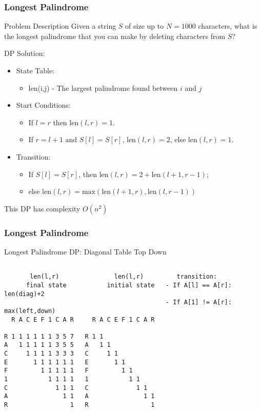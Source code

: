 \begin{frame}
  \frametitle{Longest Palindrome}
    \begin{block}{Problem Description}
      Given a string $S$ of size up to $N = 1000$ characters, what is the
      longest palindrome that you can make by deleting characters from $S$?
    \end{block}

    DP Solution:
    \begin{itemize}
    \item State Table:
      {\smaller
      \begin{itemize}
      \item len(i,j) - The largest palindrome found between $i$ and $j$
      \end{itemize}}
    \item Start Conditions:
      {\smaller
      \begin{itemize}
        \item If $l=r$ then len$(l,r)=1$.
        \item If $r=l+1 \text{ and } S[l]=S[r]$, len$(l,r)=2$, else len$(l,r)=1$.
      \end{itemize}}
    \item Transition:
      {\smaller
      \begin{itemize}
        \item If $S[l]=S[r]$, then len$(l,r)=2+\text{len}(l+1,r-1)$;
        \item else $\text{len}(l,r) = \text{max}(\text{len}(l+1,r),\text{len}(l,r-1))$
      \end{itemize}}
    \end{itemize}

    This DP has complexity $O(n^2)$
\end{frame}

\begin{frame}[fragile]
  \frametitle{Longest Palindrome}

  Longest Palindrome DP: Diagonal Table Top Down

  {\smaller
\begin{verbatim}

       len(l,r)               len(l,r)         transition:
      final state           initial state   - If A[l] == A[r]: len(diag)+2
                                            - If A[1] != A[r]: max(left,down)
  R A C E F 1 C A R     R A C E F 1 C A R

R 1 1 1 1 1 1 3 5 7   R 1 1
A   1 1 1 1 1 3 5 5   A   1 1
C     1 1 1 1 3 3 3   C     1 1
E       1 1 1 1 1 1   E       1 1
F         1 1 1 1 1   F         1 1
1           1 1 1 1   1           1 1
C             1 1 1   C             1 1
A               1 1   A               1 1
R                 1   R                 1

\end{verbatim}

  }
\end{frame}

